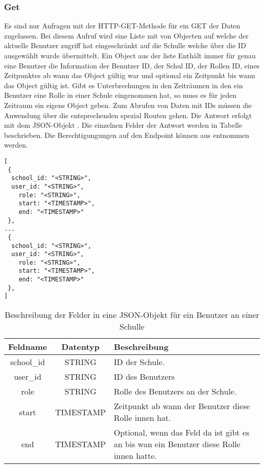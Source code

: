 \subsubsection{Get}
\label{sec:end:rest:api:school:users:get:id}
Es sind nur Anfragen mit der HTTP-GET-Methode für ein GET der Daten zugelassen.
Bei diesem Aufruf wird eine Liste mit von Objecten auf welche der aktuelle Benutzer zugriff hat eingeschränkt auf die Schulle welche über die ID ausgewählt wurde übermittelt.
Ein Object aus der liste Enthält immer für genau eine Benutzer die Information der Benutzer ID, der Schul ID, der Rollen ID, eines Zeitpunktes ab wann das Object gültig war und optional ein Zeitpunkt bis wann das Object gültig ist.
Gibt es Unterbrechungen in den Zeiträumen in den ein Benutzer eine Rolle in einer Schule eingenommen hat, so muss es für jeden Zeitraum ein eigens Object geben.
Zum Abrufen von Daten mit IDs müssen die Anwendung über die entsprechenden spezial Routen gehen.
Die Antwort erfolgt mit dem JSON-Objekt . Die einzelnen Felder der Antwort werden in Tabelle  beschrieben.
Die Berechtigungungen auf den Endpoint können aus  entnommen werden.


\begin{lstlisting}[caption={JSON-Antwort für einen GET-Aufruf der Route /api/school/users/\$id},label={lst:code:end:rest:api:school:users:get:id:ret},frame=tlrb]
[
 {
  school_id: "<STRING>",
  user_id: "<STRING>",
	role: "<STRING>",
	start: "<TIMESTAMP>",
	end: "<TIMESTAMP>"
 },
...
 {
  school_id: "<STRING>",
  user_id: "<STRING>",
	role: "<STRING>",
	start: "<TIMESTAMP>",
	end: "<TIMESTAMP>"
 },
]
\end{lstlisting}

\begin{table}[htb]
	\begin{tabularx}{\textwidth}{|c|c|X|}
		\hline
			\textbf{Feldname} & \textbf{Datentyp} & \textbf{Beschreibung} \\ \hline
			school\_id & STRING & ID der Schule. \\ \hline
			user\_id & STRING & ID des Benutzers \\ \hline
			role & STRING & Rolle des Benutzers an der Schule. \\ \hline
			start & TIMESTAMP & Zeitpunkt ab wann der Benutzer diese Rolle innen hat. \\ \hline
			end & TIMESTAMP & Optional, wenn das Feld da ist gibt es an bis wan ein Benutzer diese Rolle innen hatte. \\ \hline
	\end{tabularx}

		\caption{Beschreibung der Felder in eine JSON-Objekt für ein Benutzer an einer Schulle}
		\label{tab:end:rest:api:school:users:get:id:ret:json}
\end{table}

